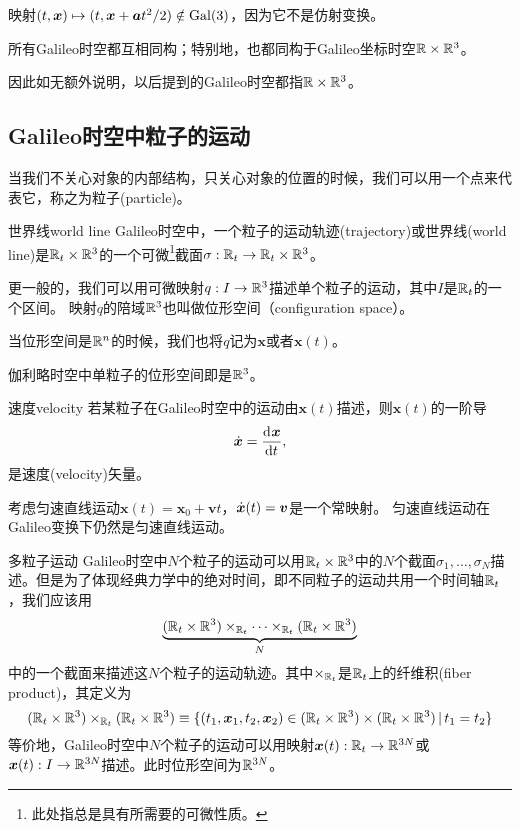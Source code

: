 \begin{example}{}{}
    映射$(t,\bm x)\mapsto(t,\bm x+\bm at^2/2)\notin\operatorname{Gal}(3)$，因为它不是仿射变换。
\end{example}
\begin{theorem}{}{}
    所有Galileo时空都互相同构；特别地，也都同构于Galileo坐标时空$\mathbb R\times\mathbb R^3$。
\end{theorem}
因此如无额外说明，以后提到的Galileo时空都指$\mathbb R\times\mathbb R^3$。

\subsection{Galileo时空中粒子的运动}
当我们不关心对象的内部结构，只关心对象的位置的时候，我们可以用一个点来代表它，称之为粒子(particle)。
\begin{definition}{世界线}{world line}
    Galileo时空中，一个粒子的运动轨迹(trajectory)或世界线(world line)是$\mathbb R_t\times\mathbb R^3$的一个可微\footnote{此处指总是具有所需要的可微性质。}截面$\sigma:\mathbb R_t\to\mathbb R_t\times\mathbb R^3$。

    更一般的，我们可以用可微映射$q:I\to\mathbb R^3$描述单个粒子的运动，其中$I$是$\mathbb R_t$的一个区间。
    映射$q$的陪域$\mathbb R^3$也叫做位形空间（configuration space）。

    当位形空间是$\mathbb R^n$的时候，我们也将$q$记为$\bm x$或者$\bm x(t)$。
\end{definition}
伽利略时空中单粒子的位形空间即是$\mathbb R^3$。
\begin{definition}{速度}{velocity}
    若某粒子在Galileo时空中的运动由$\bm x(t)$描述，则$\bm x(t)$的一阶导
    \begin{equation}
        \dot{\bm{x}}=\frac{\mathrm{d}^{{}}\bm x}{\mathrm{d}{t}^{{}}},
    \end{equation}
    是速度(velocity)矢量。
\end{definition}
\begin{example}{}{}
    考虑匀速直线运动$\bm x(t)=\bm x_0+\bm vt$，$\dot{\bm{x}}(t)=\bm v$是一个常映射。
    匀速直线运动在Galileo变换下仍然是匀速直线运动。
\end{example}

\begin{definition}{多粒子运动}{}
    Galileo时空中$N$个粒子的运动可以用$\mathbb R_t\times\mathbb R^3$中的$N$个截面$\sigma_1,\ldots,\sigma_N$描述。但是为了体现经典力学中的绝对时间，即不同粒子的运动共用一个时间轴$\mathbb R_t$，我们应该用
    \[
        \underbrace{(\mathbb R_t\times\mathbb R^3)\times_{\mathbb R_t}\cdots\times_{\mathbb R_t}(\mathbb R_t\times\mathbb R^3)}_N
    \]
    中的一个截面来描述这$N$个粒子的运动轨迹。其中$\times_{\mathbb R_t}$是$\mathbb R_t$上的纤维积(fiber product)，其定义为
    \begin{equation}
        (\mathbb R_t\times\mathbb R^3)\times_{\mathbb R_t}(\mathbb R_t\times\mathbb R^3)\equiv\{(t_1,\bm x_1,t_2,\bm x_2)\in(\mathbb R_t\times\mathbb R^3)\times(\mathbb R_t\times\mathbb R^3)\,|\,t_1=t_2\}
    \end{equation}
    等价地，Galileo时空中$N$个粒子的运动可以用映射$\bm x(t):\mathbb R_t\to\mathbb R^{3N}$或$\bm x(t):I\to\mathbb R^{3N}$描述。此时位形空间为$\mathbb R^{3N}$。
\end{definition}

